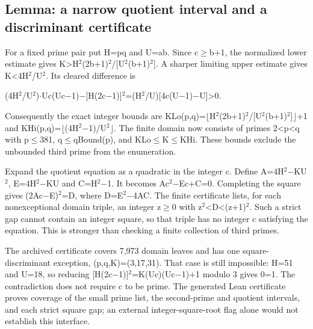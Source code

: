 \documentclass[11pt,a4paper]{article}
\begin{document}
\subsection{Lemma: a narrow quotient interval and a discriminant certificate}
For a fixed prime pair put H=pq and U=ab. Since c\ensuremath{\geq}b+1, the normalized lower estimate gives K>H\ensuremath{^2}(2b+1)\ensuremath{^2}/[U\ensuremath{^2}(b+1)\ensuremath{^2}]. A sharper limiting upper estimate gives K<4H\ensuremath{^2}/U\ensuremath{^2}. Its cleared difference is

(4H\ensuremath{^2}/U\ensuremath{^2})\ensuremath{\cdot}Uc(Uc\ensuremath{-}1)\ensuremath{-}[H(2c\ensuremath{-}1)]\ensuremath{^2}=(H\ensuremath{^2}/U)[4c(U\ensuremath{-}1)\ensuremath{-}U]>0.

Consequently the exact integer bounds are KLo(p,q)=\ensuremath{\lfloor}H\ensuremath{^2}(2b+1)\ensuremath{^2}/[U\ensuremath{^2}(b+1)\ensuremath{^2}]\ensuremath{\rfloor}+1 and KHi(p,q)=\ensuremath{\lfloor}(4H\ensuremath{^2}\ensuremath{-}1)/U\ensuremath{^2}\ensuremath{\rfloor}. The finite domain now consists of primes 2<p<q with p\ensuremath{\leq}381, q\ensuremath{\leq}qBound(p), and KLo\ensuremath{\leq}K\ensuremath{\leq}KHi. These bounds exclude the unbounded third prime from the enumeration.

Expand the quotient equation as a quadratic in the integer c. Define A=4H\ensuremath{^2}\ensuremath{-}KU\ensuremath{^2}, E=4H\ensuremath{^2}\ensuremath{-}KU and C=H\ensuremath{^2}\ensuremath{-}1. It becomes Ac\ensuremath{^2}\ensuremath{-}Ec+C=0. Completing the square gives (2Ac\ensuremath{-}E)\ensuremath{^2}=D, where D=E\ensuremath{^2}\ensuremath{-}4AC. The finite certificate lists, for each nonexceptional domain triple, an integer z\ensuremath{\geq}0 with z\ensuremath{^2}<D<(z+1)\ensuremath{^2}. Such a strict gap cannot contain an integer square, so that triple has no integer c satisfying the equation. This is stronger than checking a finite collection of third primes.

The archived certificate covers 7,973 domain leaves and has one square-discriminant exception, (p,q,K)=(3,17,31). That case is still impossible: H=51 and U=18, so reducing [H(2c\ensuremath{-}1)]\ensuremath{^2}=K(Uc)(Uc\ensuremath{-}1)+1 modulo 3 gives 0=1. The contradiction does not require c to be prime. The generated Lean certificate proves coverage of the small prime list, the second-prime and quotient intervals, and each strict square gap; an external integer-square-root flag alone would not establish this interface.
\end{document}
